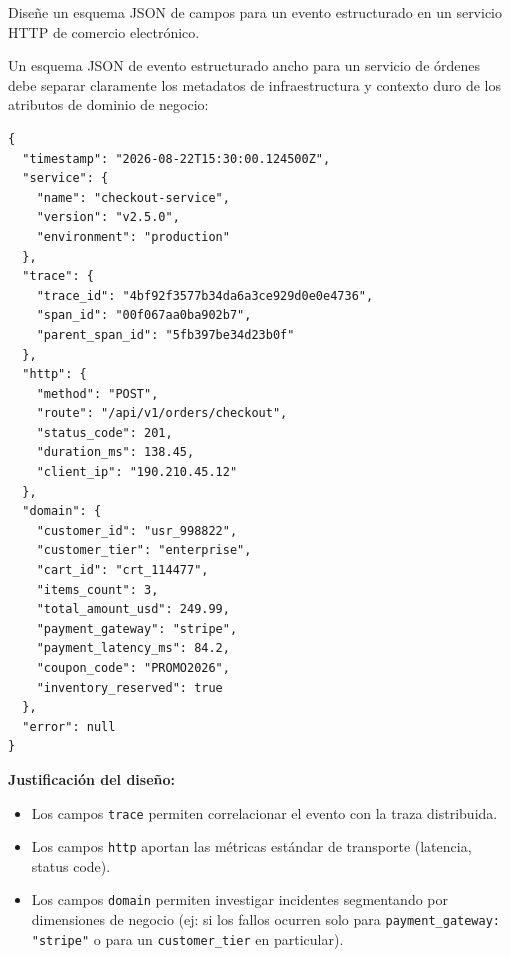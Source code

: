 \documentclass[variant=guia,cover=institutional,mode=screen]{ua-engineering-v6-article}
\begin{document}
\begin{uaexercise}
Diseñe un esquema JSON de campos para un evento estructurado en un servicio HTTP de comercio electrónico.
\end{uaexercise}
\begin{uaanswer}
Un esquema JSON de evento estructurado ancho para un servicio de órdenes debe separar claramente los metadatos de infraestructura y contexto duro de los atributos de dominio de negocio:

\begin{verbatim}
{
  "timestamp": "2026-08-22T15:30:00.124500Z",
  "service": {
    "name": "checkout-service",
    "version": "v2.5.0",
    "environment": "production"
  },
  "trace": {
    "trace_id": "4bf92f3577b34da6a3ce929d0e0e4736",
    "span_id": "00f067aa0ba902b7",
    "parent_span_id": "5fb397be34d23b0f"
  },
  "http": {
    "method": "POST",
    "route": "/api/v1/orders/checkout",
    "status_code": 201,
    "duration_ms": 138.45,
    "client_ip": "190.210.45.12"
  },
  "domain": {
    "customer_id": "usr_998822",
    "customer_tier": "enterprise",
    "cart_id": "crt_114477",
    "items_count": 3,
    "total_amount_usd": 249.99,
    "payment_gateway": "stripe",
    "payment_latency_ms": 84.2,
    "coupon_code": "PROMO2026",
    "inventory_reserved": true
  },
  "error": null
}
\end{verbatim}

\textbf{Justificación del diseño:}
\begin{itemize}
\item Los campos \texttt{trace} permiten correlacionar el evento con la traza distribuida.
\item Los campos \texttt{http} aportan las métricas estándar de transporte (latencia, status code).
\item Los campos \texttt{domain} permiten investigar incidentes segmentando por dimensiones de negocio (ej: si los fallos ocurren solo para \texttt{payment\_gateway: "stripe"} o para un \texttt{customer\_tier} en particular).
\end{itemize}
\end{uaanswer}
\end{document}
